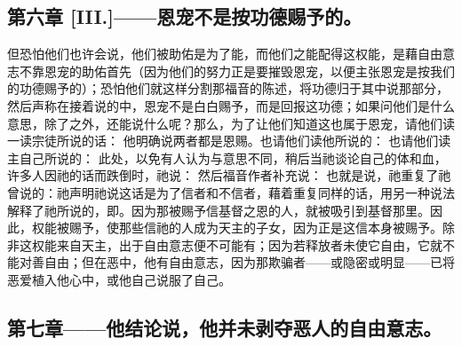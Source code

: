 
\subsection{第六章 [III.]——恩宠不是按功德赐予的。}

但恐怕他们也许会说，他们被助佑是为了能，而他们之能配得这权能，是藉自由意志不靠恩宠的助佑首先（因为他们的努力正是要摧毁恩宠，以便主张恩宠是按我们的功德赐予的）；恐怕他们就这样分割那福音的陈述，将功德归于其中说那部分，然后声称在接着说的中，恩宠不是白白赐予，而是回报这功德；如果问他们是什么意思，除了之外，还能说什么呢？那么，为了让他们知道这也属于恩宠，请他们读一读宗徒所说的话： 他明确说两者都是恩赐。也请他们读他所说的： 也请他们读主自己所说的： 此处，以免有人认为与意思不同，稍后当祂谈论自己的体和血，许多人因祂的话而跌倒时，祂说： 然后福音作者补充说： 也就是说，祂重复了祂曾说的：祂声明祂说这话是为了信者和不信者，藉着重复同样的话，用另一种说法解释了祂所说的，即。因为那被赐予信基督之恩的人，就被吸引到基督那里。因此，权能被赐予，使那些信祂的人成为天主的子女，因为正是这信本身被赐予。除非这权能来自天主，出于自由意志便不可能有；因为若释放者未使它自由，它就不能对善自由；但在恶中，他有自由意志，因为那欺骗者——或隐密或明显——已将恶爱植入他心中，或他自己说服了自己。\par


\subsection{第七章——他结论说，他并未剥夺恶人的自由意志。}

